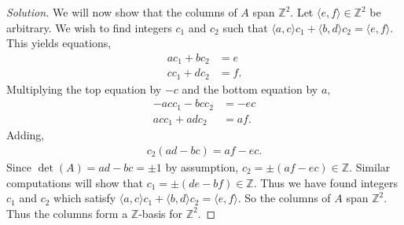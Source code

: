 \documentclass[12pt]{article}
\newcommand{\Z}{\mathbb{Z}}
\newenvironment{exercise}[2][Exercise]{\begin{trivlist}
        \item[\hskip \labelsep {\bfseries #1}\hskip \labelsep {\bfseries #2.}]}{\end{trivlist}}
\newenvironment{solution}
        {\begin{proof}[Solution]}
                    {\end{proof}}
\begin{document}
\begin{exercise}{38}
\begin{enumerate}[label=(\alph*)]
\begin{solution}
            We will now show that the columns of \( A \) span \( \Z^{2} . \) Let \( \langle e,f \rangle \in \Z^{2} \) be arbitrary. We wish to find integers \( c_{1} \) and \( c_{2} \) such that \( \langle a,c \rangle c_{1} + \langle b,d \rangle c_{2} = \langle e,f \rangle . \) This yields equations,
            \begin{align*}
                ac_{1} + b c_{2} &= e\\
                c c_{1} + d c_{2} &= f.
            \end{align*}
            Multiplying the top equation by \( -c  \) and the bottom equation by \( a , \)
            \begin{align*}
                -acc_{1} - bcc_{2} &= -ec\\
                acc_{1} + adc_{2} &= af.
            \end{align*}
            Adding,
            \begin{align*}
                c_{2} ( ad-bc ) = af - ec.
            \end{align*}
            Since \( \det(A) = ad-bc = \pm 1 \) by assumption, \( c_{2} = \pm (af-ec) \in \Z. \) Similar computations will show that \( c_{1} = \pm ( de - bf ) \in \Z  . \) Thus we have found integers \( c_{1} \) and \( c_{2} \) which satisfy \( \langle a,c \rangle c_{1} + \langle b,d \rangle c_{2} = \langle e,f \rangle . \) So the columns of \( A \) span \( \Z^{2} . \) Thus the columns form a \( \Z \)-basis for \( \Z^{2} . \)
        \end{solution}
    \end{enumerate}
\end{exercise}
\end{document}
